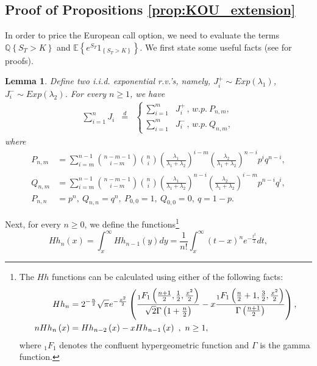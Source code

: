 \documentclass[11pt]{article}
\newtheorem{lemma}[theorem]{Lemma}
\numberwithin{equation}{section}
\numberwithin{theorem}{section}
\begin{document}

\subsection{Proof of Propositions \ref{prop:KOU_extension}\label{apx:kou}}

In order to price the European call option, we need to evaluate the
terms $\mathbb{Q}\left\{ S_{T}>K\right\} $ and $\mathbb{E}\left\{ e^{S_{T}}1_{\left\{ S_{T}>K\right\} }\right\} $. We first state some useful facts (see   \citet{Kou2002} for proofs). 
\begin{lemma}
Define two i.i.d. exponential r.v.'s,  namely,  $J_{i}^{+}\sim Exp(\lambda_{1})$,
$J_{i}^{-}\sim Exp(\lambda_{2})$. For every $n\geq1$,  we have 
\begin{eqnarray*}
\sum_{i=1}^{n}J_{i} & \overset{d}{=} & \begin{cases}
\sum_{i=1}^{m} & J_{i}^{+}\,,\, w.p.\ P_{n,m},\\
\sum_{i=1}^{m} & J_{i}^{-}\,,\, w.p.\ Q_{n,m},
\end{cases}
\end{eqnarray*}
 where 
\begin{align*}
P_{n,m}&=  \sum_{i=m}^{n-1}\binom{n-m-1}{i-m}\binom{n}{i}\left(\frac{\lambda_{1}}{\lambda_{1}+\lambda_{2}}\right)^{i-m}\left(\frac{\lambda_{2}}{\lambda_{1}+\lambda_{2}}\right)^{n-i}p^{i}q^{n-i},\\
Q_{n,m} & =\sum_{i=m}^{n-1}\binom{n-m-1}{i-m}\binom{n}{i}\left(\frac{\lambda_{1}}{\lambda_{1}+\lambda_{2}}\right)^{n-i}\left(\frac{\lambda_{2}}{\lambda_{1}+\lambda_{2}}\right)^{i-m}p^{n-i}q^{i},\\
P_{n,n}&=p^{n} ,\ Q_{n,n}=q^{n},\ P_{0,0}=1,\ Q_{0,0}=0,\ q=1-p.
\end{align*}
\end{lemma}
 
Next, for every $n\geq0$, we define the functions\footnote{The $Hh$ functions can be calculated using either of the following facts: 
\begin{align}
Hh_{n}&=2^{-\frac{n}{2}}\sqrt{\pi}e^{-\frac{x^{2}}{2}}\left(\frac{_{1}F_{1}\left(\frac{n+1}{2},\frac{1}{2},\frac{x^{2}}{2}\right)}{\sqrt{2}\Gamma\left(1+\frac{n}{2}\right)}-x\frac{_{1}F_{1}\left(\frac{n}{2}+1,\frac{3}{2},\frac{x^{2}}{2}\right)}{\Gamma\left(\frac{n+1}{2}\right)}\right),\notag\\
nHh_{n}\left(x\right)&=Hh_{n-2}\left(x\right)-xHh_{n-1}\left(x\right)\ ,\ n\geq1,\notag
\end{align}
 where $_{1}F_{1}$ denotes the confluent hypergeometric function
and $\Gamma$ is the gamma function.} 
\[
Hh_{n}\left(x\right)=\int_{x}^{\infty}Hh_{n-1}\left(y\right)dy=\frac{1}{n!}\int_{x}^{\infty}\left(t-x\right)^{n}e^{-\frac{t^{2}}{2}}dt,
\]
 
\end{document}
